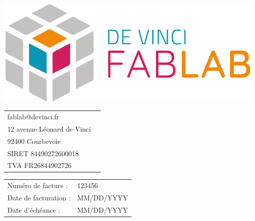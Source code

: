 \documentclass[12pt,a4paper]{article}
\begin{document}
\begin{minipage}{0.5\textwidth}
\includegraphics[width=0.5\linewidth]{../assets/logo_fablab.png}

\vspace{0.5cm}

\begin{tabular}{ll}
fablab@devinci.fr \\
12 avenue Léonard de Vinci \\
92400 Courbevoie \\
SIRET 84490272600018 \\
TVA  FR26844902726 \\
\end{tabular}
\end{minipage}
\begin{minipage}{0.5\textwidth}
\begin{flushright}
\begin{tabular}{ll}
Numéro de facture : & 123456 \\
Date de facturation : & MM/DD/YYYY \\
Date d'échéance : & MM/DD/YYYY \\
\end{tabular}
\end{flushright}
\end{minipage}
\end{document}
